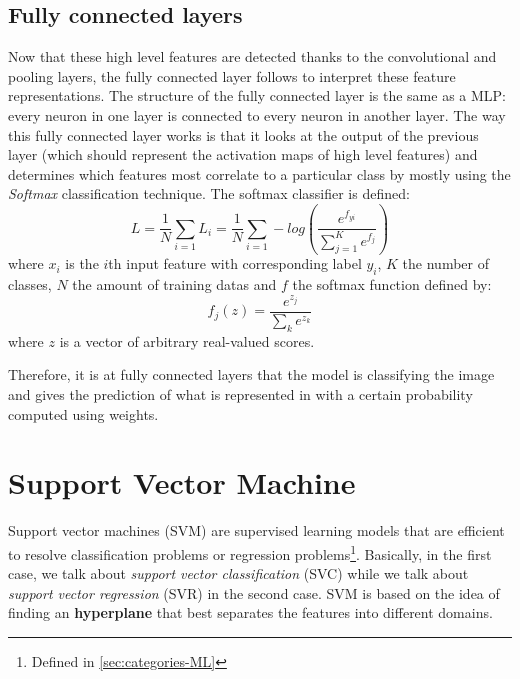 \documentclass[11pt, openany]{report}
\theoremstyle{plain}
\theoremstyle{definition}
\theoremstyle{remark}
\begin{document}
\subsection{Fully connected layers} \label{sec:fully-connected-layer}
Now that these high level features are detected thanks to the convolutional and pooling layers, the fully connected layer follows to interpret these feature representations. The structure of the fully connected layer is the same as a MLP: every neuron in one layer is connected to every neuron in another layer. The way this fully connected layer works is that it looks at the output of the previous layer (which should represent the activation maps of high level features) and determines which features most correlate to a particular class by mostly using the \textit{Softmax} classification technique.
The softmax classifier is defined: 
$$ L = \frac{1}{N} \sum_{i=1} L_{i} =  \frac{1}{N} \sum_{i = 1} - log \left(  \frac{e^{f_{yi}}}{\sum_{j=1}^K e^{f_{j}}}  \right) $$ 
where $x_{i}$ is the $i$th input feature with corresponding label $y_{i}$, $K$ the number of classes, $N$ the amount of training datas and $f$ the softmax function defined by: 
$$ f_{j}(z) = \frac{e^{z_{j}}}{\sum_{k} e^{z_{k}}} $$ where $z$ is a vector of arbitrary real-valued scores. 

Therefore, it is at fully connected layers that the model is classifying the image and gives the prediction of what is represented in with a certain probability computed using weights.






\newpage
\section{Support Vector Machine} \label{sec:svm}
Support vector machines (SVM) are supervised learning models that are efficient to resolve classification problems or regression problems\footnote{Defined in \autoref{sec:categories-ML}}. Basically, in the first case, we talk about \textit{support vector classification} (SVC) while we talk about \textit{support vector regression} (SVR) in the second case. SVM is based on the idea of finding an \textbf{hyperplane} that best separates the features into different domains. 
\end{document}
